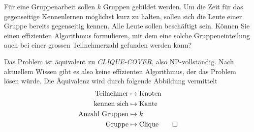 Für eine Gruppenarbeit sollen $k$ Gruppen gebildet werden.
Um die Zeit für das gegenseitige Kennenlernen möglichst
kurz zu halten, sollen sich die Leute einer Gruppe bereits
gegenseitig kennen. Alle Leute sollen beschäftigt sein.
Können Sie einen effizienten Algorithmus
formulieren, mit dem eine solche Gruppeneinteilung auch bei
einer grossen Teilnehmerzahl gefunden werden kann?


\begin{loesung}
Das Problem ist äquivalent zu \textsl{CLIQUE-COVER}, also
NP-vollständig. Nach aktuellem Wissen gibt es also keine
effizienten Algorithmus, der das Problem lösen würde. Die
Äquivalenz wird durch folgende Abbildung vermittelt
\begin{align*}
\text{Teilnehmer}&\mapsto\text{Knoten}\\
\text{kennen sich}&\mapsto\text{Kante}\\
\text{Anzahl Gruppen}&\mapsto k\\
\text{Gruppe}&\mapsto\text{Clique}
\qedhere
\end{align*}
\end{loesung}
